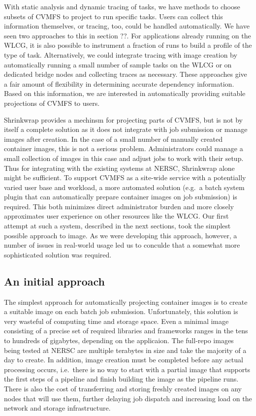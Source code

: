 \documentclass[conference]{IEEEtran}
\begin{document}
With static analysis and dynamic tracing of tasks,
we have methods to choose subsets of CVMFS to project to run specific tasks.
Users can collect this information themselves,
or tracing, too, could be handled automatically.
We have seen two approaches to this in section ??.
For applications already running on the WLCG,
it is also possible to instrument a fraction of runs to build a profile of the type of task.
Alternatively, we could integrate tracing with image creation by automatically running a small number of sample tasks on the WLCG or on dedicated bridge nodes and collecting traces as necessary.
These approaches give a fair amount of flexibility in determining accurate dependency information.
Based on this information,
we are interested in automatically providing suitable projections of CVMFS to users.

Shrinkwrap provides a mechinsm for projecting parts of CVMFS,
but is not by itself a complete solution as it does not integrate with job submission or manage images after creation.
In the case of a small number of manually created container images,
this is not a serious problem.
Administrators could manage a small collection of images in this case and adjust jobs to work with their setup.
Thus for integrating with the existing systems at NERSC,
Shrinkwrap alone might be sufficient.
To support CVMFS as a site-wide service with a potentially varied user base and workload,
a more automated solution
(e.g.\ a batch system plugin that can automatically prepare container images on job submission)
is required.
This both minimizes direct administrator burden and more closely approximates user experience on other resources like the WLCG.
Our first attempt at such a system,
described in the next sections,
took the simplest possible approach to image.
As we were developing this approach, however,
a number of issues in real-world usage led us to conculde that a somewhat more sophisticated solution was required.

\subsection{An initial approach}

The simplest approach for automatically projecting container images is to create a suitable image on each batch job submission.
Unfortunately, this solution is very wasteful of computing time and storage space.
Even a minimal image consisting of a precise set of required libraries and frameworks ranges in the tens to hundreds of gigabytes,
depending on the applicaion.
The full-repo images being tested at NERSC are multiple terabytes in size and take the majority of a day to create.
In addition, image creation must be completed before any actual processing occurs,
i.e.\ there is no way to start with a partial image that supports the first steps of a pipeline and finish building the image as the pipeline runs.
There is also the cost of transferring and storing freshly created images on any nodes that will use them,
further delaying job dispatch and increasing load on the network and storage infrastructure.
\end{document}
